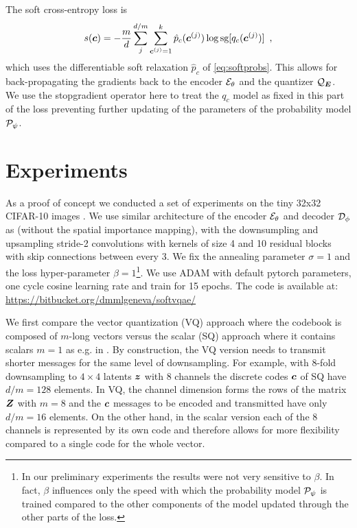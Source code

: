 \documentclass{article} %
\newcommand{\qc}{q_c}
\newcommand{\gEt}{\gE_\theta}
\newcommand{\gQE}{\gQ_\mE}
\newcommand{\gDp}{\gD_\phi}
\newcommand{\gPp}{\gP_{\psi}}
\begin{document}
The soft cross-entropy loss is
\begin{align}
s(\vc) = - \frac{m}{d} \sum_j^{d/m} \sum_{\vc^{(j)} = 1}^k \hat{p}_c(\vc^{(j)}) \log \textrm{sg}[\qc(\vc^{(j)})] \enspace ,
\end{align}
which uses the differentiable soft relaxation $\hat{p}_c$ of \eqref{eq:softprobs}. 
This allows for back-propagating the gradients back to the encoder $\gEt$ and the quantizer $\gQE$. 
We use the stopgradient operator here to treat the $\qc$ model as fixed in this part of the loss preventing further updating of the parameters of the probability model $\gPp$.


\section{Experiments}

As a proof of concept we conducted a set of experiments on the tiny 32x32 CIFAR-10 images \citep{krizhevskyLearningMultipleLayers2009}.
We use similar architecture of the encoder $\gEt$ and decoder $\gDp$ as \citet{mentzerConditionalProbabilityModels2018} (without the spatial importance mapping), with the downsumpling and upsampling stride-2 convolutions with kernels of size 4 and 10 residual blocks with skip connections between every 3.
We fix the annealing parameter $\sigma=1$ and the loss hyper-parameter $\beta=1$\footnote{In our preliminary experiments the results were not very sensitive to $\beta$. In fact, $\beta$ influences only the speed with which the probability model $\gPp$ is trained compared to the other components of the model updated through the other parts of the loss.}.
We use ADAM with default pytorch parameters, one cycle cosine learning rate and train for 15 epochs.
The code is available at: \url{https://bitbucket.org/dmmlgeneva/softvqae/}

We first compare the vector quantization (VQ) approach where the codebook is composed of $m$-long vectors versus the scalar (SQ) approach where it contains scalars $m=1$ as e.g. in \cite{mentzerConditionalProbabilityModels2018}.
By construction, the VQ version needs to transmit shorter messages for the same level of downsampling. For example, with 8-fold downsampling to $4 \times 4$ latents ${\bm{z}}$ with 8 channels the discrete codes ${\bm{c}}$ of SQ have $d/m = 128$ elements.
In VQ, the channel dimension forms the rows of the matrix ${\bm{Z}}$ with $m=8$ and the ${\bm{c}}$ messages to be encoded and transmitted have only $d/m = 16$ elements.
On the other hand, in the scalar version each of the 8 channels is represented by its own code and therefore allows for more flexibility compared to a single code for the whole vector.
\end{document}
